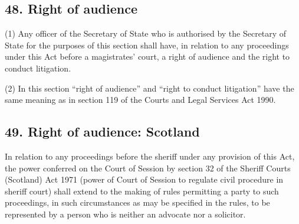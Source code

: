 \documentclass[12pt,a4paper]{article}
\begin{document}
\subsection{48. Right of audience}

(1) Any 
officer of the 
Secretary of State  %
who is authorised  %
by the 
Secretary of State  %
for the purposes of this section shall have, in relation to any proceedings under this Act before a magistrates' court, a right of audience and the right to conduct litigation.

(2) In this section “right of audience” and “right to conduct litigation” have the same meaning as in section 119 of the Courts and Legal Services Act 1990.


\subsection{49. Right of audience: Scotland}

In relation to any proceedings before the sheriff under any provision of this Act, the power conferred on the Court of Session by section 32 of the Sheriff Courts (Scotland) Act 1971 (power of Court of Session to regulate civil procedure in sheriff court) shall extend to the making of rules permitting a party to such proceedings, in such circumstances as may be specified in the rules, to be represented by a person who is neither an advocate nor a solicitor.

\end{document}
